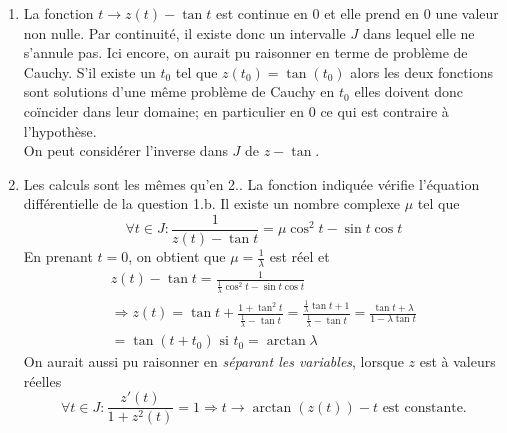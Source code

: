 \begin{enumerate}
\begin{enumerate}
\item La fonction $t\rightarrow z(t)-\tan t$ est continue en $0$ et elle prend en $0$ une valeur non nulle. Par continuité, il existe donc un intervalle $J$ dans lequel elle ne s'annule pas. Ici encore, on aurait pu raisonner en terme de problème de Cauchy. S'il existe un $t_0$ tel que $z(t_0)=\tan(t_0)$ alors les deux fonctions sont solutions d'une même problème de Cauchy en $t_0$ elles doivent donc coïncider dans leur domaine; en particulier en $0$ ce qui est contraire à l'hypothèse.\\
On peut considérer l'inverse dans $J$ de $z-\tan$.
\item Les calculs sont les mêmes qu'en 2.. La fonction indiquée vérifie l'équation différentielle de la question 1.b. Il existe un nombre complexe $\mu$ tel que
\begin{displaymath}
\forall t\in J : \frac{1}{z(t) -\tan t} = \mu \cos^2t-\sin t \cos t
\end{displaymath}
En prenant $t=0$, on obtient que $\mu=\frac{1}{\lambda}$ est réel et
\begin{multline*}
 z(t)-\tan t = \frac{1}{\frac{1}{\lambda}\cos^2t - \sin t \cos t} \\
\Rightarrow z(t)= \tan t + \frac{1+\tan^2t}{\frac{1}{\lambda}-\tan t } 
=\frac{\frac{1}{\lambda}\tan t +1}{\frac{1}{\lambda}-\tan t }=\frac{\tan t + \lambda}{1-\lambda \tan t}\\
=\tan(t+t_0) \text{ si } t_0=\arctan \lambda
\end{multline*}
On aurait aussi pu raisonner en \emph{séparant les variables}, lorsque $z$ est à valeurs réelles 
\begin{displaymath}
 \forall t\in J : \frac{z'(t)}{1+z^2(t)}=1\Rightarrow t\rightarrow \arctan(z(t))-t \text{ est constante.}
\end{displaymath}

\end{enumerate}
\end{enumerate}

